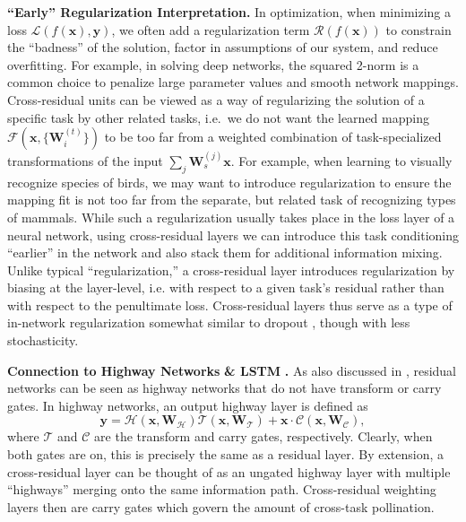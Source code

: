 \documentclass{sig-alternate-05-2015}
\newcommand{\mb}{\mathbf}
\begin{document}
\vspace{1.6mm}
\noindent \textbf{``Early'' Regularization Interpretation.}
In optimization, when minimizing a loss $\mathcal{L}(f(\mb x), \mb y)$, we often add a regularization term $\mathcal{R}(f(\mb x))$ to constrain the ``badness'' of the solution, factor in assumptions of our system, and reduce overfitting.
For example, in solving deep networks, the squared 2-norm is a common choice to penalize large parameter values and smooth network mappings.
Cross-residual units can be viewed as a way of regularizing the solution of a specific task by other related tasks, i.e.~we do not want the learned mapping $\mathcal{F}(\mb x, \{\mb W_i^{(t)}\})$ to be too far from a weighted combination of task-specialized transformations of the input $\sum_j \mb W_s^{(j)}\mb x$.
For example, when learning to visually recognize species of birds, we may want to introduce regularization to ensure the mapping fit is not too far from the separate, but related task of recognizing types of mammals.
While such a regularization usually takes place in the loss layer of a neural network, using cross-residual layers we can introduce this task conditioning ``earlier'' in the network and also stack them for additional information mixing.
Unlike typical ``regularization,'' a cross-residual layer introduces regularization by biasing at the layer-level, i.e. with respect to a given task’s residual rather than with respect to the penultimate loss.
Cross-residual layers thus serve as a type of in-network regularization somewhat similar to dropout \cite{srivastava_2014}, though with less stochasticity.

\vspace{1.6mm}
\noindent \textbf{Connection to Highway Networks} \cite{srivastava_2015} \textbf{ \& LSTM } \cite{hochreiter_1997}\textbf{.}
As also discussed in \cite{he_2016}, residual networks can be seen as highway networks \cite{srivastava_2015} that do not have transform or carry gates.
In highway networks, an output highway layer is defined as
%
\begin{equation}
  \mb y = \mathcal{H}(\mb x, \mb W_\mathcal{H}) \mathcal{T}(\mb x, \mb W_\mathcal{T}) + \mb x \cdot \mathcal{C}(\mb x, \mb W_\mathcal{C}),
  \label{eq:highway}
\end{equation}
%
where $\mathcal{T}$ and $\mathcal{C}$ are the transform and carry gates, respectively.
Clearly, when both gates are on, this is precisely the same as a residual layer.
By extension, a cross-residual layer can be thought of as an ungated highway layer with multiple ``highways'' merging onto the same information path.
Cross-residual weighting layers then are carry gates which govern the amount of cross-task pollination.
\end{document}
